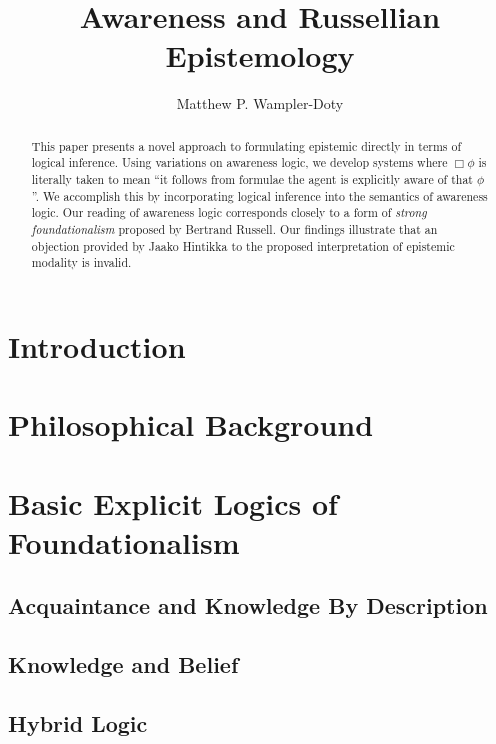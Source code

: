 \documentclass{article}
\begin{document}
\title{Awareness and Russellian Epistemology}\author{Matthew P.
Wampler-Doty}\date{}\maketitle

\begin{abstract}
This paper presents a novel approach to formulating epistemic directly
in terms of logical inference.  Using variations on awareness logic,
we develop systems where $\Box \phi$ is
literally taken to mean ``it follows from formulae the agent is explicitly aware of
that $\phi$''.  We accomplish this by incorporating logical inference into the semantics
of awareness logic.  Our reading of awareness logic corresponds
closely to a form of \emph{strong foundationalism} proposed by Bertrand
Russell\cite{russell_problems_1936}.  Our findings illustrate that an
objection provided by Jaako Hintikka\cite{hintikka_knowledge_1969} to
the proposed interpretation of epistemic modality is invalid.
\end{abstract}

\listoftodos
\section{Introduction}
\label{intro}


\section{Philosophical Background}
\label{trad}


\section{Basic Explicit Logics of Foundationalism}

\subsection{Acquaintance and Knowledge By Description}
\label{awarenesslogic0}


\subsection{Knowledge and Belief}
\label{awarenesslogic}


\subsection{Hybrid Logic}
\label{hybrid_awareness}

\end{document}
